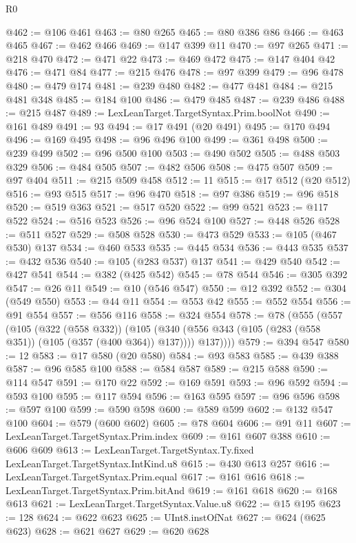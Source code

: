 \begin{lexlean}{R0}
\begin{coremodule}
@462 := @106 @461
@463 := @80 @265
@465 := @80 @386 @86
@466 := @463 @465
@467 := @462 @466
@469 := @147 @399 @11
@470 := @97 @265
@471 := @218 @470
@472 := @471 @22
@473 := @469 @472
@475 := @147 @404 @42
@476 := @471 @84
@477 := @215 @476
@478 := @97 @399
@479 := @96 @478
@480 := @479 @174
@481 := @239 @480
@482 := @477 @481
@484 := @215 @481 @348
@485 := @184 @100
@486 := @479 @485
@487 := @239 @486
@488 := @215 @487
@489 := LexLeanTarget.TargetSyntax.Prim.boolNot
@490 := @161 @489
@491 := 93
@494 := @17 @491 (@20 @491)
@495 := @170 @494
@496 := @169 @495
@498 := @96 @496 @100
@499 := @361 @498
@500 := @239 @499
@502 := @96 @500 @100
@503 := @490 @502
@505 := @488 @503 @329
@506 := @484 @505
@507 := @482 @506
@508 := @475 @507
@509 := @97 @404
@511 := @215 @509 @458
@512 := 11
@515 := @17 @512 (@20 @512)
@516 := @93 @515
@517 := @96 @470
@518 := @97 @386
@519 := @96 @518
@520 := @519 @363
@521 := @517 @520
@522 := @99 @521
@523 := @117 @522
@524 := @516 @523
@526 := @96 @524 @100
@527 := @448 @526
@528 := @511 @527
@529 := @508 @528
@530 := @473 @529
@533 := @105 (@467 @530) @137
@534 := @460 @533
@535 := @445 @534
@536 := @443 @535
@537 := @432 @536
@540 := @105 (@283 @537) @137
@541 := @429 @540
@542 := @427 @541
@544 := @382 (@425 @542)
@545 := @78 @544
@546 := @305 @392
@547 := @26 @11
@549 := @10 (@546 @547)
@550 := @12 @392
@552 := @304 (@549 @550)
@553 := @44 @11
@554 := @553 @42
@555 := @552 @554
@556 := @91 @554
@557 := @556 @116
@558 := @324 @554
@578 := @78
    (@555
      (@557
        (@105
          (@322 (@558 @332))
          (@105 (@340 (@556 @343 (@105 (@283 (@558 @351)) (@105 (@357 (@400 @364)) @137)))) @137))))
@579 := @394 @547
@580 := 12
@583 := @17 @580 (@20 @580)
@584 := @93 @583
@585 := @439 @388
@587 := @96 @585 @100
@588 := @584 @587
@589 := @215 @588
@590 := @114 @547
@591 := @170 @22
@592 := @169 @591
@593 := @96 @592
@594 := @593 @100
@595 := @117 @594
@596 := @163 @595
@597 := @96 @596
@598 := @597 @100
@599 := @590 @598
@600 := @589 @599
@602 := @132 @547 @100
@604 := @579 (@600 @602)
@605 := @78 @604
@606 := @91 @11
@607 := LexLeanTarget.TargetSyntax.Prim.index
@609 := @161 @607 @388
@610 := @606 @609
@613 := LexLeanTarget.TargetSyntax.Ty.fixed LexLeanTarget.TargetSyntax.IntKind.u8
@615 := @430 @613 @257
@616 := LexLeanTarget.TargetSyntax.Prim.equal
@617 := @161 @616
@618 := LexLeanTarget.TargetSyntax.Prim.bitAnd
@619 := @161 @618
@620 := @168 @613
@621 := LexLeanTarget.TargetSyntax.Value.u8
@622 := @15 @195
@623 := 128
@624 := @622 @623
@625 := UInt8.instOfNat
@627 := @624 (@625 @623)
@628 := @621 @627
@629 := @620 @628

\end{coremodule}
\end{lexlean}
